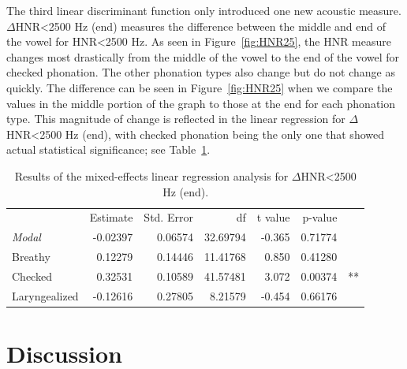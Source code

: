 \documentclass[12pt, letterpaper]{article}
\providecommand{\lsptoprule}{\midrule\toprule}
\providecommand{\lspbottomrule}{\bottomrule\midrule}
\begin{document}
The third linear discriminant function only introduced one new acoustic measure. $ \Delta $HNR<2500 Hz (end) measures the difference between the middle and end of the vowel for HNR\textless 2500 Hz. As seen in Figure~\ref{fig:HNR25}, the HNR measure changes most drastically from the middle of the vowel to the end of the vowel for checked phonation. The other phonation types also change but do not change as quickly. The difference can be seen in Figure~\ref{fig:HNR25} when we compare the values in the middle portion of the graph to those at the end for each phonation type. This magnitude of change is reflected in the linear regression for $ \Delta $ HNR<2500 Hz (end), with checked phonation being the only one that showed actual statistical significance; see Table~\ref{tab:delta}. 

\begin{table}[!h]
    \centering
    \caption{Results of the mixed-effects linear regression analysis for $ \Delta $HNR<2500 Hz (end).}
    \label{tab:delta}
    \begin{tabular}{lrrrrrl}
	\lsptoprule
					&  Estimate  & Std. Error & df & t value & p-value & \\
        \textit{Modal}  &   -0.02397 &   0.06574  & 32.69794 & -0.365 & 0.71774 & \\  
  	Breathy   		&    0.12279 &   0.14446  & 11.41768 &  0.850 & 0.41280 & \\
	Checked    		&    0.32531 &   0.10589  & 41.57481 &  3.072 & 0.00374 & ** \\
	Laryngealized	&   -0.12616 &   0.27805  &  8.21579 & -0.454 & 0.66176 & \\
    \lspbottomrule
    \end{tabular}
\end{table}

\section{Discussion} \label{sec:Discussion}

\end{document}
